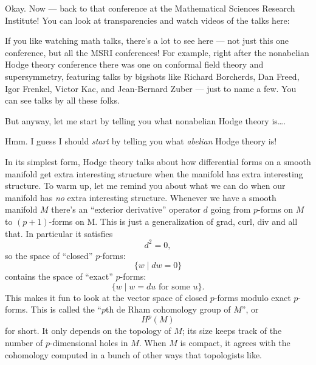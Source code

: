 \documentclass{article}
\def\tightlist{}
\renewcommand{\texttt}[1]{%
  \begingroup
  \ttfamily
  \begingroup\lccode`~=`/\lowercase{\endgroup\def~}{/\discretionary{}{}{}}%
  \begingroup\lccode`~=`[\lowercase{\endgroup\def~}{[\discretionary{}{}{}}%
  \begingroup\lccode`~=`.\lowercase{\endgroup\def~}{.\discretionary{}{}{}}%
  \catcode`/=\active\catcode`[=\active\catcode`.=\active
  \scantokens{#1\noexpand}%
  \endgroup
}
\begin{document}

Okay. Now --- back to that conference at the Mathematical Sciences
Research Institute! You can look at transparencies and watch videos of
the talks here:


If you like watching math talks, there's a lot to see here --- not just
this one conference, but all the MSRI conferences! For example, right
after the nonabelian Hodge theory conference there was one on conformal
field theory and supersymmetry, featuring talks by bigshots like Richard
Borcherds, Dan Freed, Igor Frenkel, Victor Kac, and Jean-Bernard Zuber
--- just to name a few. You can see talks by all these folks.

But anyway, let me start by telling you what nonabelian Hodge theory
is\ldots.

Hmm. I guess I should \emph{start} by telling you what \emph{abelian}
Hodge theory is!

In its simplest form, Hodge theory talks about how differential forms on
a smooth manifold get extra interesting structure when the manifold has
extra interesting structure. To warm up, let me remind you about what we
can do when our manifold has \emph{no} extra interesting structure.
Whenever we have a smooth manifold \(M\) there's an ``exterior
derivative'' operator \(d\) going from \(p\)-forms on \(M\) to
\((p+1)\)-forms on M. This is just a generalization of grad, curl, div
and all that. In particular it satisfies \[d^2 = 0,\] so the space of
``closed'' \(p\)-forms: \[\{w \mid dw = 0\}\] contains the space of
``exact'' \(p\)-forms: \[\{w \mid \mbox{$w = du$ for some $u$}\}.\] This
makes it fun to look at the vector space of closed \(p\)-forms modulo
exact \(p\)-forms. This is called the ``\(p\)th de Rham cohomology group
of \(M\)'', or \[H^p(M)\] for short. It only depends on the topology of
\(M\); its size keeps track of the number of \(p\)-dimensional holes in
\(M\). When \(M\) is compact, it agrees with the cohomology computed in
a bunch of other ways that topologists like.
\end{document}
